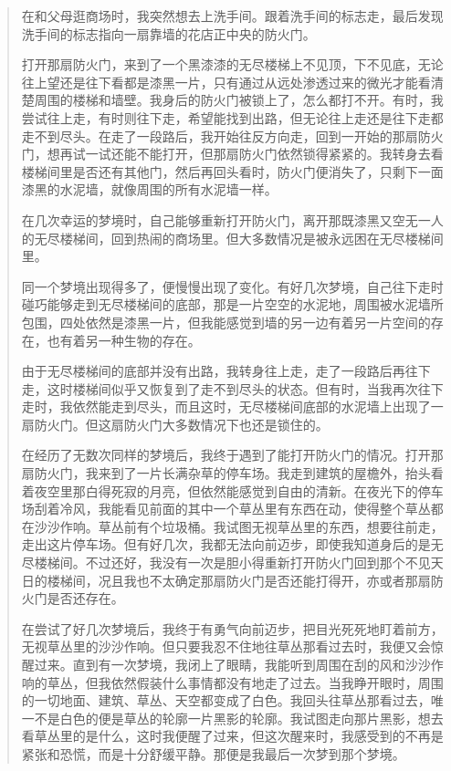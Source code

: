 \blockquote{
在和父母逛商场时，我突然想去上洗手间。跟着洗手间的标志走，最后发现洗手间的标志指向一扇靠墙的花店正中央的防火门。

打开那扇防火门，来到了一个黑漆漆的无尽楼梯\pozhehao{}上不见顶，下不见底，无论往上望还是往下看都是漆黑一片，只有通过从远处渗透过来的微光才能看清楚周围的楼梯和墙壁。我身后的防火门被锁上了，怎么都打不开。有时，我尝试往上走，有时则往下走，希望能找到出路，但无论往上走还是往下走都走不到尽头。在走了一段路后，我开始往反方向走，回到一开始的那扇防火门，想再试一试还能不能打开，但那扇防火门依然锁得紧紧的。我转身去看楼梯间里是否还有其他门，然后再回头看时，防火门便消失了，只剩下一面漆黑的水泥墙，就像周围的所有水泥墙一样。

在几次幸运的梦境时，自己能够重新打开防火门，离开那既漆黑又空无一人的无尽楼梯间，回到热闹的商场里。但大多数情况是被永远困在无尽楼梯间里。

同一个梦境出现得多了，便慢慢出现了变化。有好几次梦境，自己往下走时碰巧能够走到无尽楼梯间的底部，那是一片空空的水泥地，周围被水泥墙所包围，四处依然是漆黑一片，但我能感觉到墙的另一边有着另一片空间的存在，也有着另一种生物的存在。

由于无尽楼梯间的底部并没有出路，我转身往上走，走了一段路后再往下走，这时楼梯间似乎又恢复到了走不到尽头的状态。但有时，当我再次往下走时，我依然能走到尽头，而且这时，无尽楼梯间底部的水泥墙上出现了一扇防火门。但这扇防火门大多数情况下也还是锁住的。

在经历了无数次同样的梦境后，我终于遇到了能打开防火门的情况。打开那扇防火门，我来到了一片长满杂草的停车场。我走到建筑的屋檐外，抬头看着夜空里那白得死寂的月亮，但依然能感觉到自由的清新。在夜光下的停车场刮着冷风，我能看见前面的其中一个草丛里有东西在动，使得整个草丛都在沙沙作响。草丛前有个垃圾桶。我试图无视草丛里的东西，想要往前走，走出这片停车场。但有好几次，我都无法向前迈步，即使我知道身后的是无尽楼梯间。不过还好，我没有一次是胆小得重新打开防火门回到那个不见天日的楼梯间，况且我也不太确定那扇防火门是否还能打得开，亦或者那扇防火门是否还存在。

在尝试了好几次梦境后，我终于有勇气向前迈步，把目光死死地盯着前方，无视草丛里的沙沙作响。但只要我忍不住地往草丛那看过去时，我便又会惊醒过来。直到有一次梦境，我闭上了眼睛，我能听到周围在刮的风和沙沙作响的草丛，但我依然假装什么事情都没有地走了过去。当我睁开眼时，周围的一切\pozhehao{}地面、建筑、草丛、天空\pozhehao{}都变成了白色。我回头往草丛那看过去，唯一不是白色的便是草丛的轮廓\pozhehao{}一片黑影的轮廓。我试图走向那片黑影，想去看草丛里的是什么，这时我便醒了过来，但这次醒来时，我感受到的不再是紧张和恐慌，而是十分舒缓平静。那便是我最后一次梦到那个梦境。

}

